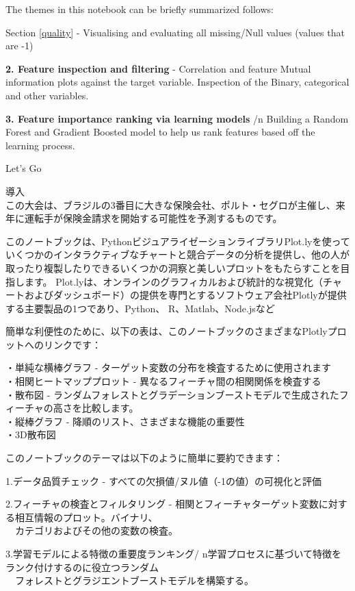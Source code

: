 \documentclass[11pt]{article}
\begin{document}
The themes in this notebook can be briefly summarized follows:

Section \ref{quality} - Visualising and evaluating all missing/Null
values (values that are -1)

\textbf{2. Feature inspection and filtering} - Correlation and feature
Mutual information plots against the target variable. Inspection of the
Binary, categorical and other variables.

\textbf{3. Feature importance ranking via learning models} /n Building a
Random Forest and Gradient Boosted model to help us rank features based
off the learning process.

Let's Go

    導入\\
この大会は、ブラジルの3番目に大きな保険会社、ポルト・セグロが主催し、来年に運転手が保険金請求を開始する可能性を予測するものです。

このノートブックは、PythonビジュアライゼーションライブラリPlot.lyを使っていくつかのインタラクティブなチャートと競合データの分析を提供し、他の人が取ったり複製したりできるいくつかの洞察と美しいプロットをもたらすことを目指します。
Plot.lyは、オンラインのグラフィカルおよび統計的な視覚化（チャートおよびダッシュボード）の提供を専門とするソフトウェア会社Plotlyが提供する主要製品の1つであり、Python、
R、Matlab、Node.jsなど

簡単な利便性のために、以下の表は、このノートブックのさまざまなPlotlyプロットへのリンクです：

・単純な横棒グラフ - ターゲット変数の分布を検査するために使用されます\\
・相関ヒートマッププロット - 異なるフィーチャ間の相関関係を検査する\\
・散布図 -
ランダムフォレストとグラデーションブーストモデルで生成されたフィーチャの高さを比較します。\\
・縦棒グラフ - 降順のリスト、さまざまな機能の重要性\\
・3D散布図

このノートブックのテーマは以下のように簡単に要約できます：

1.データ品質チェック - すべての欠損値/ヌル値（-1の値）の可視化と評価

2.フィーチャの検査とフィルタリング -
相関とフィーチャターゲット変数に対する相互情報のプロット。バイナリ、\\
　カテゴリおよびその他の変数の検査。

3.学習モデルによる特徴の重要度ランキング/
n学習プロセスに基づいて特徴をランク付けするのに役立つランダム\\
　フォレストとグラジエントブーストモデルを構築する。
\end{document}
